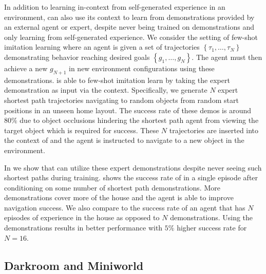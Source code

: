 In addition to learning in-context from self-generated experience in an environment, \method can also use its context to learn from demonstrations provided by an external agent or expert, despite never being trained on demonstrations and only learning from self-generated experience. 
We consider the setting of few-shot imitation learning \citep{duan2017one,wang2020generalizing} where an agent is given a set of trajectories $ \left\{ \tau_1, \dots,  \tau_N \right\} $ demonstrating behavior reaching desired goals $\left\{ g_1, \dots,  g_N \right\} $. The agent must then achieve a new $ g_{N+1}$ in new environment configurations using these demonstrations. 
\method is able to few-shot imitation learn by taking the expert demonstration as input via the context. Specifically, we generate $ N$ expert shortest path trajectories navigating to random objects from random start positions in an unseen home layout.
The success rate of these demos is around $ 80\%$ due to object occlusions hindering the shortest path agent from viewing the target object which is required for success.
These $ N$ trajectories are inserted into the context of \method and the agent is instructed to navigate to a new object in the environment. 

In  we show that \method can utilize these expert demonstrations despite never seeing such shortest paths during training.  shows the success rate of \method in a single episode after conditioning on some number of shortest path demonstrations. More demonstrations cover more of the house and the agent is able to improve navigation success.
We also compare to the success rate of an agent that has $ N$ episodes of experience in the house as opposed to $ N$ demonstrations. Using the demonstrations results in better performance with $ 5\%$ higher success rate for $ N=16$. 

\vspace{-5pt}
\subsection{Darkroom and Miniworld}
\label{sec:darkroom} 
\vspace{-5pt}

